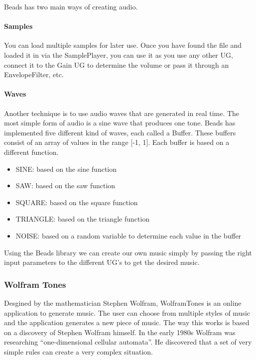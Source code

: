 \documentclass[12pt]{article}
\begin{document}
Beads has two main ways of creating audio.

\paragraph{Samples}

You can load multiple samples for later use. Once you have found the file and loaded it in via the SamplePlayer, you can use it as you use any other UG, connect it to the Gain UG to determine the volume or pass it through an EnvelopeFilter, etc.  

\paragraph{Waves}

Another technique is to use audio waves that are generated in real time. The most simple form of audio is a sine wave that produces one tone. Beads has implemented five different kind of waves, each called a Buffer. These buffers consist of an array of values in the range [-1, 1]. Each buffer is based on a different function.
\begin{itemize}
\item SINE:  based on the sine function
\item SAW: based on the saw function
\item SQUARE: based on the square function
\item TRIANGLE: based on the triangle function
\item NOISE: based on a random variable to determine each value in the buffer
\end{itemize} 

Using the Beads library we can create our own music simply by passing the right input parameters to the different UG's to get the desired music.

\subsubsection{Wolfram Tones}

Desgined by the mathematician Stephen Wolfram, WolframTones is an online application to generate music. The user can choose from multiple styles of music and the application generates a new piece of music. The way this works is based on a discovery of Stephen Wolfram himself. In the early 1980s Wolfram was researching ``one-dimensional cellular automata''. He discovered that a set of very simple rules can create a very complex situation. 
\newline
\end{document}
